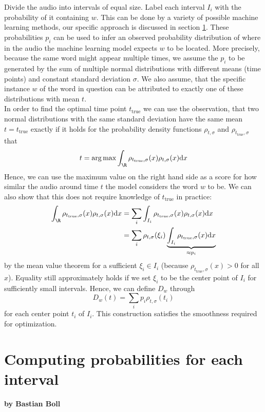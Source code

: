Divide the audio into intervals of equal size. Label each interval $I_i$ with the probability of it containing $w$. This can be done by a variety of possible machine learning methods, our specific approach is discussed in section \ref{interval_word_prob}. These probabilities $p_i$ can be used to infer an observed probability distribution of where in the audio the machine learning model expects $w$ to be located. More precisely, because the same word might appear multiple times, we assume the $p_i$ to be generated by the sum of multiple normal distributions with different means (time points) and constant standard deviation $\sigma$. We also assume, that the specific instance $w$ of the word in question can be attributed to exactly one of these distributions with mean $t$.\\
In order to find the optimal time point $t_\text{true}$ we can use the observation, that two normal distributions with the same standard deviation have the same mean $t=t_\text{true}$ exactly if it holds for the probability density functions $\rho_{t,\sigma}$ and $\rho_{t_\text{true},\sigma}$ that
\[t = \arg\max \int_\R \rho_{t_\text{true},\sigma}(x)\rho_{t,\sigma}(x)\text{d}x\]
Hence, we can use the maximum value on the right hand side as a score for how similar the audio around time $t$ the model considers the word $w$ to be. We can also show that this does not require knowledge of $t_\text{true}$ in practice:
\begin{align*}
	\int_\R \rho_{t_\text{true},\sigma}(x)\rho_{t,\sigma}(x)\text{d}x &= \sum_{i} \int_{I_i} \rho_{t_\text{true},\sigma}(x)\rho_{t,\sigma}(x)\text{d}x\\
			&= \sum_i \rho_{t,\sigma}(\xi_i) \underbrace{\int_{I_i} \rho_{t_\text{true},\sigma}(x)\text{d}x}_{\approx p_i}
\end{align*}
by the mean value theorem for a sufficient $\xi_i\in I_i$ (because $\rho_{t_\text{true},\sigma}(x) > 0$ for all $x$). Equality still approximately holds if we set $\xi_i$ to be the center point of $I_i$ for sufficiently small intervals. 
Hence, we can define $D_w$ through
\[
	D_w(t) = \sum_i p_i \rho_{t,\sigma}(t_i)
\]
for each center point $t_i$ of $I_i$. This construction satisfies the smoothness required for optimization.

\section{Computing probabilities for each interval}
\label{interval_word_prob}

\textbf{by Bastian Boll} \\
















